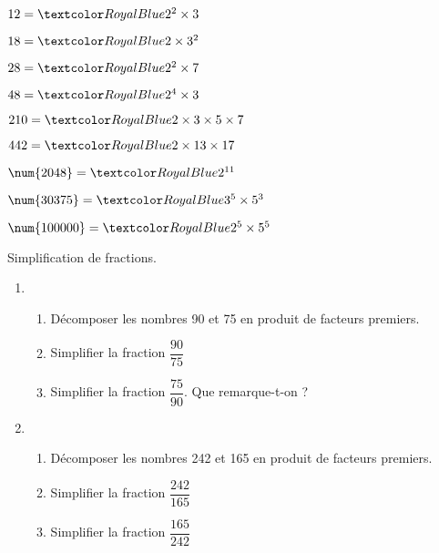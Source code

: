 \begin{Maquette}[Fiche,CorrigeFin,Colonnes=2]{}
\begin{multicols}{2}
      \begin{Solution}
         \begin{colenumerate}
            \item $12 =\cor{2^2\times3}$
            \item $18 =\cor{2\times3^2}$
            \item $28 =\cor{2^2\times7}$
            \item $48 =\cor{2^4\times3}$
            \item $210 =\cor{2\times3\times5\times7}$
            \item $442 =\cor{2\times13\times17}$
            \item $\num{2048} =\cor{2^{11}}$
            \item $\num{30375} =\cor{3^5\times5^3}$
            \item $\num{100000} =\cor{2^5\times5^5}$
         \end{colenumerate}
      \end{Solution}


      \begin{exercice} %
         Simplification de fractions.
         \begin{enumerate}
            \item
               \begin{enumerate}
                  \item Décomposer les nombres 90 et 75 en produit de facteurs premiers.
                  \item Simplifier la fraction $\dfrac{90}{75}$ \smallskip
                  \item Simplifier la fraction $\dfrac{75}{90}$. Que remarque-t-on ? \smallskip
               \end{enumerate}
            \item
               \begin{enumerate}
                  \item Décomposer les nombres 242 et 165 en produit de facteurs premiers.
                  \item Simplifier la fraction $\dfrac{242}{165}$ \smallskip
                  \item Simplifier la fraction $\dfrac{165}{242}$
               \end{enumerate}
         \end{enumerate}
      \end{exercice}


\end{multicols}
\end{Maquette}
